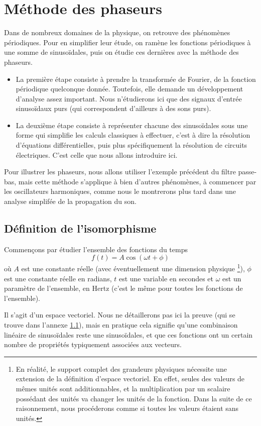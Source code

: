 \section{Méthode des phaseurs}

Dans de nombreux domaines de la physique,
on retrouve des phénomènes périodiques.
Pour en simplifier leur étude,
on ramène les fonctions périodiques à une somme de sinusoïdales,
puis on étudie ces dernières avec la méthode des phaseurs.
\begin{itemize}
    \item La première étape consiste à prendre la transformée de Fourier,
        de la fonction périodique quelconque donnée.
        Toutefois, elle demande un développement d'analyse assez important.
        Nous n'étudierons ici que des signaux d'entrée sinusoïdaux purs
        (qui correspondent d'ailleurs à des sons purs).
    \item La deuxième étape consiste à représenter chacune des sinusoïdales
        sous une forme qui simplifie les calculs classiques à effectuer,
        c'est à dire la résolution d'équations différentielles,
        puis plus spécifiquement la résolution de circuits électriques.
        C'est celle que nous allons introduire ici.
\end{itemize}

Pour illustrer les phaseurs, nous allons utiliser l'exemple précédent
du filtre passe-bas,
mais cette méthode s'applique à bien d'autres phénomènes,
à commencer par les oscillateurs harmoniques,
comme nous le montrerons plus tard dans
une analyse simplifée de la propagation du son.

\subsection{Définition de l'isomorphisme}
Commençons par étudier l'ensemble des fonctions du temps
\[
    f(t) = A\cos(\omega t + \phi)
\]
où $A$ est une constante réelle (avec éventuellement une dimension physique
\footnote{
    En réalité, le support complet des grandeurs physiques
    nécessite une extension de la définition d'espace vectoriel.
    En effet, seules des valeurs de mêmes unités sont additionnables,
    et la multiplication par un scalaire possédant des unités
    va changer les unités de la fonction.
    Dans la suite de ce raisonnement,
    nous procéderons comme si toutes les valeurs étaient sans unités.
}),
$\phi$ est une constante réelle en radians,
$t$ est une variable en secondes
et $\omega$ est un paramètre de l'ensemble, en Hertz
(c'est le même pour toutes les fonctions de l'ensemble).

Il s'agit d'un espace vectoriel.
Nous ne détaillerons pas ici la preuve
(qui se trouve dans l'annexe \ref{}),
mais en pratique cela signifie qu'une combinaison linéaire
de sinusoïdales reste une sinusoïdales,
et que ces fonctions ont un certain nombre de propriétés
typiquement associées aux vecteurs.
